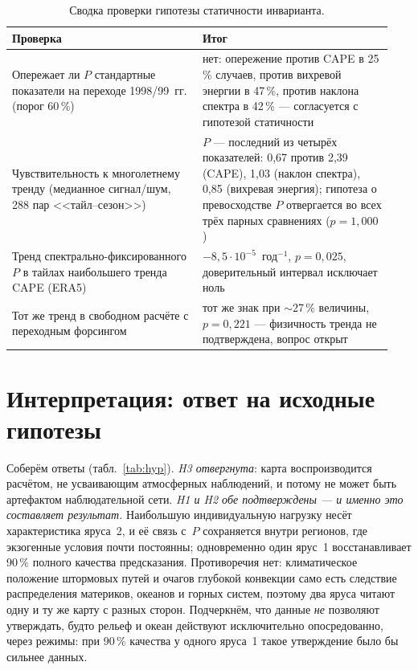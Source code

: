 \documentclass[11pt,a4paper]{article}
\begin{document}
\begin{table}[t]
\centering
\caption{Сводка проверки гипотезы статичности инварианта.}
\label{tab:static}
\small
\begin{tabular}{@{}p{0.47\linewidth}p{0.47\linewidth}@{}}
\toprule
Проверка & Итог\\
\midrule
Опережает ли $P$ стандартные показатели на переходе 1998/99~гг. (порог 60\,\%) & нет: опережение против CAPE в 25\,\% случаев, против вихревой энергии в 47\,\%, против наклона спектра в 42\,\% --- согласуется с гипотезой статичности\\
Чувствительность к многолетнему тренду (медианное сигнал/шум, 288 пар <<тайл--сезон>>) & $P$ --- последний из четырёх показателей: 0,67 против 2,39 (CAPE), 1,03 (наклон спектра), 0,85 (вихревая энергия); гипотеза о превосходстве $P$ отвергается во всех трёх парных сравнениях ($p=1{,}000$)\\
Тренд спектрально-фиксированного $P$ в тайлах наибольшего тренда CAPE (ERA5) & $-8{,}5\cdot10^{-5}$~год$^{-1}$, $p=0{,}025$, доверительный интервал исключает ноль\\
Тот же тренд в свободном расчёте с переходным форсингом & тот же знак при $\sim$27\,\% величины, $p=0{,}221$ --- физичность тренда не подтверждена, вопрос открыт\\
\bottomrule
\end{tabular}
\end{table}

\section{Интерпретация: ответ на исходные гипотезы}
\label{sec:interp}

Соберём ответы (табл.~\ref{tab:hyp}). \emph{H3 отвергнута}: карта воспроизводится расчётом, не усваивающим атмосферных наблюдений, и потому не может быть артефактом наблюдательной сети. \emph{H1 и H2 обе подтверждены --- и именно это составляет результат.} Наибольшую индивидуальную нагрузку несёт характеристика яруса~2, и её связь с~$P$ сохраняется внутри регионов, где экзогенные условия почти постоянны; одновременно один ярус~1 восстанавливает 90\,\% полного качества предсказания. Противоречия нет: климатическое положение штормовых путей и очагов глубокой конвекции само есть следствие распределения материков, океанов и горных систем, поэтому два яруса читают одну и ту же карту с разных сторон. Подчеркнём, что данные \emph{не} позволяют утверждать, будто рельеф и океан действуют исключительно опосредованно, через режимы: при 90\,\% качества у одного яруса~1 такое утверждение было бы сильнее данных.
\end{document}
